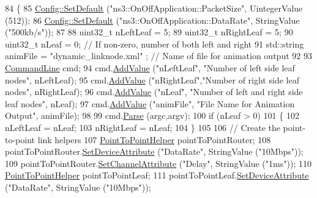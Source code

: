 \begin{DoxyCode}
84 \{
85   \hyperlink{group__config_ga2e7882df849d8ba4aaad31c934c40c06}{Config::SetDefault} (\textcolor{stringliteral}{"ns3::OnOffApplication::PacketSize"}, UintegerValue (512));
86   \hyperlink{group__config_ga2e7882df849d8ba4aaad31c934c40c06}{Config::SetDefault} (\textcolor{stringliteral}{"ns3::OnOffApplication::DataRate"}, StringValue (\textcolor{stringliteral}{"500kb/s"}));
87 
88   uint32\_t    nLeftLeaf = 5;
89   uint32\_t    nRightLeaf = 5;
90   uint32\_t    nLeaf = 0; \textcolor{comment}{// If non-zero, number of both left and right}
91   std::string animFile = \textcolor{stringliteral}{"dynamic\_linknode.xml"} ;  \textcolor{comment}{// Name of file for animation output}
92 
93   \hyperlink{classns3_1_1CommandLine}{CommandLine} cmd;
94   cmd.\hyperlink{classns3_1_1CommandLine_addcfb546c7ad4c8bd0965654d55beb8e}{AddValue} (\textcolor{stringliteral}{"nLeftLeaf"}, \textcolor{stringliteral}{"Number of left side leaf nodes"}, nLeftLeaf);
95   cmd.\hyperlink{classns3_1_1CommandLine_addcfb546c7ad4c8bd0965654d55beb8e}{AddValue} (\textcolor{stringliteral}{"nRightLeaf"},\textcolor{stringliteral}{"Number of right side leaf nodes"}, nRightLeaf);
96   cmd.\hyperlink{classns3_1_1CommandLine_addcfb546c7ad4c8bd0965654d55beb8e}{AddValue} (\textcolor{stringliteral}{"nLeaf"},     \textcolor{stringliteral}{"Number of left and right side leaf nodes"}, nLeaf);
97   cmd.\hyperlink{classns3_1_1CommandLine_addcfb546c7ad4c8bd0965654d55beb8e}{AddValue} (\textcolor{stringliteral}{"animFile"},  \textcolor{stringliteral}{"File Name for Animation Output"}, animFile);
98 
99   cmd.\hyperlink{classns3_1_1CommandLine_a5c10b85b3207e5ecb48d907966923156}{Parse} (argc,argv);
100   \textcolor{keywordflow}{if} (nLeaf > 0)
101     \{
102       nLeftLeaf = nLeaf;
103       nRightLeaf = nLeaf;
104     \}
105 
106   \textcolor{comment}{// Create the point-to-point link helpers}
107   \hyperlink{classns3_1_1PointToPointHelper}{PointToPointHelper} pointToPointRouter;
108   pointToPointRouter.\hyperlink{classns3_1_1PointToPointHelper_a4577f5ab8c387e5528af2e0fbab1152e}{SetDeviceAttribute}  (\textcolor{stringliteral}{"DataRate"}, StringValue (\textcolor{stringliteral}{"10Mbps"}));
109   pointToPointRouter.\hyperlink{classns3_1_1PointToPointHelper_a6b5317fd17fb61e5a53f8d66a90b63b9}{SetChannelAttribute} (\textcolor{stringliteral}{"Delay"}, StringValue (\textcolor{stringliteral}{"1ms"}));
110   \hyperlink{classns3_1_1PointToPointHelper}{PointToPointHelper} pointToPointLeaf;
111   pointToPointLeaf.\hyperlink{classns3_1_1PointToPointHelper_a4577f5ab8c387e5528af2e0fbab1152e}{SetDeviceAttribute}    (\textcolor{stringliteral}{"DataRate"}, StringValue (\textcolor{stringliteral}{"10Mbps"}));

\end{DoxyCode}
